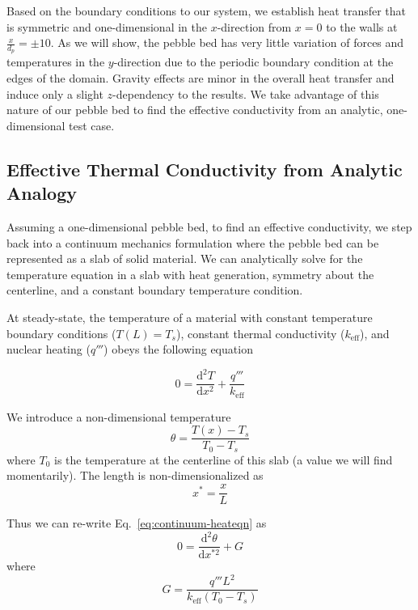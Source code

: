 Based on the boundary conditions to our system, we establish heat transfer that is symmetric and one-dimensional in the $x$-direction from $x=0$ to the walls at $\frac{x}{d_p} = \pm 10$. As we will show, the pebble bed has very little variation of forces and temperatures in the $y$-direction due to the periodic boundary condition at the edges of the domain. Gravity effects are minor in the overall heat transfer and induce only a slight $z$-dependency to the results. We take advantage of this nature of our pebble bed to find the effective conductivity from an analytic, one-dimensional test case.





\subsection{Effective Thermal Conductivity from Analytic Analogy}
Assuming a one-dimensional pebble bed, to find an effective conductivity, we step back into a continuum mechanics formulation where the pebble bed can be represented as a slab of solid material. We can analytically solve for the temperature equation in a slab with heat generation, symmetry about the centerline, and a constant boundary temperature condition.

At steady-state, the temperature of a material with constant temperature boundary conditions ($T(L) = T_s$), constant thermal conductivity ($k_\text{eff}$), and nuclear heating ($q'''$) obeys the following equation

\begin{equation}\label{eq:continuum-heateqn}
	0 = \frac{\mathrm{d}^2T}{\mathrm{d}x^2} + \frac{q'''}{k_\text{eff}}
\end{equation}

We introduce a non-dimensional temperature
\begin{equation}
	\theta = \frac{T(x) - T_s}{T_0 - T_s}
\end{equation}
where $T_0$ is the temperature at the centerline of this slab (a value we will find momentarily). The length is non-dimensionalized as
\begin{equation}
	x^* = \frac{x}{L}
\end{equation}

Thus we can re-write Eq.~\ref{eq:continuum-heateqn} as
\begin{equation}\label{eq:continuum-heateqn-nondim}
	0 = \frac{\mathrm{d}^2\theta}{\mathrm{d}x^{*2}} + G
\end{equation}
where
\begin{equation}
	G = \frac{q'''L^2}{k_\text{eff}(T_0 - T_s)}
\end{equation}

